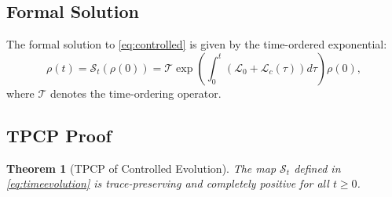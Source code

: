 \documentclass[11pt]{article}
\newtheorem{theorem}{Theorem}[section]
\begin{document}
\subsection{Formal Solution}
The formal solution to \eqref{eq:controlled} is given by the time-ordered exponential:
\begin{equation}
\rho(t) = \mathcal{S}_t(\rho(0)) = \mathcal{T} \exp\left( \int_0^t (\mathcal{L}_0 + \mathcal{L}_c(\tau)) d\tau \right) \rho(0),
\label{eq:timeevolution}
\end{equation}
where $\mathcal{T}$ denotes the time-ordering operator.

\subsection{TPCP Proof}
\begin{theorem}[TPCP of Controlled Evolution]
The map $\mathcal{S}_t$ defined in \eqref{eq:timeevolution} is trace-preserving and completely positive for all $t \geq 0$.
\end{theorem}
\end{document}
